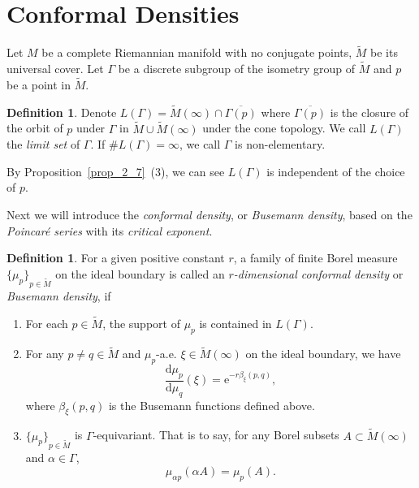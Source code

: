 \documentclass[reqno,11pt]{article}
\theoremstyle{definition}
\newtheorem{definition}[theorem]{Definition}
\theoremstyle{remark}
\numberwithin{equation}{section}
\begin{document}
\section{\bf Conformal Densities}\label{sec3}
Let $M$ be a complete Riemannian manifold with no conjugate points, $\widetilde{M}$ be its universal cover. Let $\Gamma$ be a discrete subgroup of the isometry group of $\widetilde{M}$ and $p$ be a point in $\widetilde{M}$.

\begin{definition}
	Denote $L(\Gamma)=\widetilde{M}(\infty)\cap\overline{\Gamma(p)}$ where $\overline{\Gamma(p)}$ is the closure of the orbit of $p$ under $\Gamma$ in $\widetilde{M}\cup\widetilde{M}(\infty)$ under the cone topology. We call $L(\Gamma)$ the \emph{limit set} of $\Gamma$. If $\#L(\Gamma)=\infty$, we call $\Gamma$ is non-elementary.
\end{definition}

By Proposition~\ref{prop_2_7}~(3), we can see $L(\Gamma)$ is independent of the choice of $p$.

Next we will introduce the \emph{conformal density}, or \emph{Busemann density}, based on the \emph{Poincar\'e series} with its \emph{critical exponent}.

\begin{definition}
    For a given positive constant $r$, a family of finite Borel measure ${\{\mu_p\}}_{p\in\widetilde{M}}$ on the ideal boundary is called an \emph{$r$-dimensional conformal density} or \emph{Busemann density}, if
	\begin{enumerate}
		\item For each $p\in\widetilde{M}$, the support of $\mu_p$ is contained in $L(\Gamma)$.
		\item For any $p\neq q\in\widetilde{M}$ and $\mu_p$-a.e. $\xi\in\widetilde{M}(\infty)$ on the ideal boundary, we have
		      \begin{displaymath}
			      \frac{\mathrm{d}\mu_p}{\mathrm{d}\mu_q}(\xi)=\mathrm{e}^{-r\beta_{\xi}(p,q)},
		      \end{displaymath}
		      where $\beta_{\xi}(p,q)$ is the Busemann functions defined above.
		\item ${\{\mu_p\}}_{p\in\widetilde{M}}$ is $\Gamma$-equivariant. That is to say, for any Borel subsets $A\subset\widetilde{M}(\infty)$ and $\alpha\in\Gamma$,
		      \begin{displaymath}
			      \mu_{\alpha p}(\alpha A)=\mu_p(A).
		      \end{displaymath}
	\end{enumerate}
\end{definition}
\end{document}
